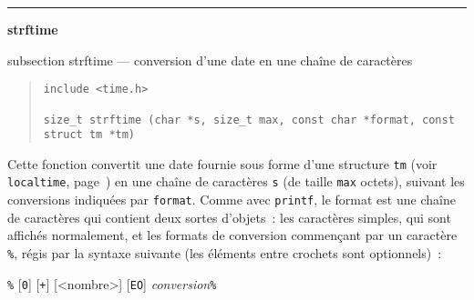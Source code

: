\documentclass [twoside] {report}
\newcommand {\primitive} [1]
    {
	\phantomsection
	{\large \textbf {#1}}
	\addcontentsline {toc} {subsection} {#1}
    }
\newcommand {\separation}
    {
	\vspace {5mm}
	\nopagebreak
	\hrule
    }
\begin{document}
\separation
\primitive {strftime} --- conversion d'une date en une chaîne de caractères

\begin {quote}
\begin {verbatim}
include <time.h>

size_t strftime (char *s, size_t max, const char *format, const struct tm *tm)
\end{verbatim}
\end {quote}

Cette fonction convertit une date fournie sous forme d'une structure
\texttt {tm} (voir \texttt {localtime}, page~\pageref {struct-tm}) en
une chaîne de caractères \texttt {s} (de taille \texttt {max} octets),
suivant les conversions indiquées par \texttt {format}.
Comme avec \texttt {printf}, le format est une chaîne de caractères
qui contient deux sortes d'objets~:  les caractères simples, qui sont
affichés normalement, et les formats de conversion commençant par un
caractère \texttt {\%}, régis par la syntaxe suivante (les éléments entre
crochets sont optionnels)~:

\texttt {\%} [\texttt {0}] [\texttt {+}] [<nombre>] [\texttt {E}\texttt {O}] \textit {conversion}\texttt {\%}
\end{document}
